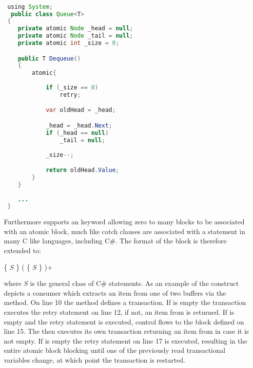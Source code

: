 \begin{lstlisting}[label=lst:stm_atomic_syntax_retry,
 caption={Retry Syntax},
 language=Java, 
 showspaces=false,
 showtabs=false,
 breaklines=true,
 showstringspaces=false,
 breakatwhitespace=true,
 commentstyle=\color{greencomments},
 keywordstyle=\color{bluekeywords},
 stringstyle=\color{redstrings},
 morekeywords={atomic, retry, orElse, var, get, set, using}]  % Start your code-block

 using System;
  public class Queue<T>
 {
 	private atomic Node _head = null;
 	private atomic Node _tail = null;
 	private atomic int _size = 0;

 	public T Dequeue()
 	{
 		atomic{
 		
 			if (_size == 0)
 				retry;

 			var oldHead = _head;

 			_head = _head.Next;
 			if (_head == null)
 				_tail = null;
 			
 			_size--;

 			return oldHead.Value;
 		}
 	}
 	
 	...
 }
\end{lstlisting}

Furthermore \stmnamesp supports an  keyword allowing zero to many  blocks to be associated with an atomic block, much like catch clauses are associated with a  statement in many C like languages, including C\#\cite[p. 96]{sestoft2011c}. The  format of the  block is therefore extended to:

 \{ $S$ \} (  \{ $S$ \} )+

where $S$ is the general class of C\# statements. As an example of the  construct   depicts a consumer which extracts an item from one of two buffers via the  method. On line 10 the  method defines a transaction. If  is empty the transaction executes the retry statement on line 12, if not, an item from  is returned. If  is empty and the retry statement is executed, control flows to the  block defined on line 15. The  then executes its own transaction returning an item from  in case it is not empty. If  is empty the retry statement on line 17 is executed, resulting in the entire atomic block blocking until one of the previously read transactional variables change, at which point the transaction is restarted.

